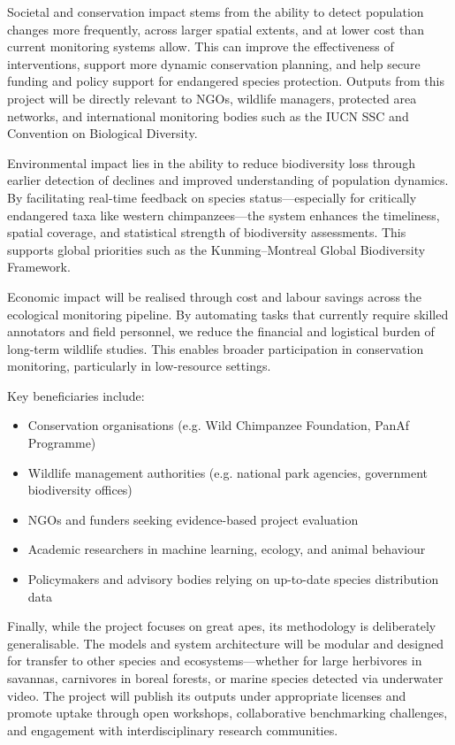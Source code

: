 Societal and conservation impact stems from the ability to detect population changes more frequently, across larger spatial extents, and at lower cost than current monitoring systems allow. This can improve the effectiveness of interventions, support more dynamic conservation planning, and help secure funding and policy support for endangered species protection. Outputs from this project will be directly relevant to NGOs, wildlife managers, protected area networks, and international monitoring bodies such as the IUCN SSC and Convention on Biological Diversity.

Environmental impact lies in the ability to reduce biodiversity loss through earlier detection of declines and improved understanding of population dynamics. By facilitating real-time feedback on species status—especially for critically endangered taxa like western chimpanzees—the system enhances the timeliness, spatial coverage, and statistical strength of biodiversity assessments. This supports global priorities such as the Kunming–Montreal Global Biodiversity Framework.

Economic impact will be realised through cost and labour savings across the ecological monitoring pipeline. By automating tasks that currently require skilled annotators and field personnel, we reduce the financial and logistical burden of long-term wildlife studies. This enables broader participation in conservation monitoring, particularly in low-resource settings.

Key beneficiaries include:

\begin{itemize}
    \item Conservation organisations (e.g. Wild Chimpanzee Foundation, PanAf Programme)
    \item Wildlife management authorities (e.g. national park agencies, government biodiversity offices)
    \item NGOs and funders seeking evidence-based project evaluation
    \item Academic researchers in machine learning, ecology, and animal behaviour
    \item Policymakers and advisory bodies relying on up-to-date species distribution data
\end{itemize}

Finally, while the project focuses on great apes, its methodology is deliberately generalisable. The models and system architecture will be modular and designed for transfer to other species and ecosystems—whether for large herbivores in savannas, carnivores in boreal forests, or marine species detected via underwater video. The project will publish its outputs under appropriate licenses and promote uptake through open workshops, collaborative benchmarking challenges, and engagement with interdisciplinary research communities.


